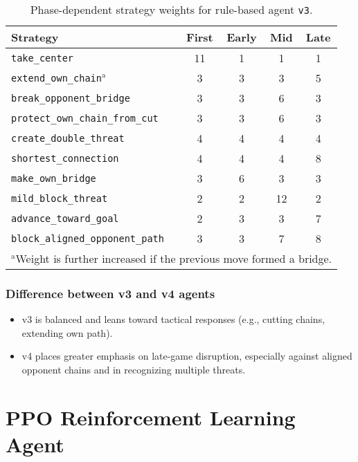 \documentclass[conference]{IEEEtran}
\begin{document}
\begin{table}[htbp]
\caption{Phase-dependent strategy weights for rule-based agent \texttt{v3}.}
\begin{center}
\begin{tabular}{|l|c|c|c|c|}
\hline
\textbf{Strategy} & \textbf{First} & \textbf{Early} & \textbf{Mid} & \textbf{Late} \\
\hline
\texttt{take\_center}                   & 11 & 1  & 1  & 1   \\
\texttt{extend\_own\_chain}$^{\mathrm{a}}$        & 3  & 3  & 3  & 5   \\
\texttt{break\_opponent\_bridge}        & 3  & 3  & 6  & 3   \\
\texttt{protect\_own\_chain\_from\_cut} & 3  & 3  & 6  & 3   \\
\texttt{create\_double\_threat}         & 4  & 4  & 4  & 4   \\
\texttt{shortest\_connection}           & 4  & 4  & 4  & 8   \\
\texttt{make\_own\_bridge}              & 3  & 6  & 3  & 3   \\
\texttt{mild\_block\_threat}            & 2  & 2  & 12 & 2   \\
\texttt{advance\_toward\_goal}          & 2  & 3  & 3  & 7   \\
\texttt{block\_aligned\_opponent\_path} & 3  & 3  & 7  & 8   \\
\hline
\multicolumn{5}{l}{$^{\mathrm{a}}$Weight is further increased if the previous move formed a bridge.}
\end{tabular}
\label{tab:rulebased_v3_weights}
\end{center}
\end{table}
\subsubsection{Difference between v3 and v4 agents}
\begin{itemize}[]
\item v3 is balanced and leans toward tactical responses (e.g., cutting chains, extending own path).
\item v4 places greater emphasis on late-game disruption, especially against aligned opponent chains and in recognizing multiple threats.
\end{itemize}

\section{PPO Reinforcement Learning Agent}
\end{document}

